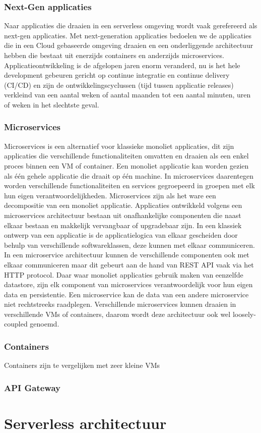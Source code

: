 \subsubsection{Next-Gen applicaties}
Naar applicaties die draaien in een serverless omgeving wordt vaak gerefereerd als next-gen applicaties. Met next-generation applicaties bedoelen we de applicaties die in een Cloud gebaseerde omgeving draaien en een onderliggende architectuur hebben die bestaat uit enerzijds containers en anderzijds microservices. Applicatieontwikkeling is de afgelopen jaren enorm veranderd, nu is het hele development gebeuren gericht op continue integratie en continue delivery (CI/CD) en zijn de ontwikkelingscyclussen (tijd tussen applicatie releases) verkleind van een aantal weken of aantal maanden tot een aantal minuten, uren of weken in het slechtste geval. 

\subsubsection{Microservices}
Microservices is een alternatief voor klassieke monoliet applicaties, dit zijn applicaties die verschillende functionaliteiten omvatten en draaien als een enkel proces binnen een VM of container. Een monoliet applicatie kan worden gezien als één gehele applicatie die draait op één machine.  In microservices daarentegen worden verschillende functionaliteiten en services gegroepeerd in groepen met elk hun eigen verantwoordelijkheden. Microservices zijn als het ware  een decompositie van een monoliet applicatie. Applicaties ontwikkeld volgens een microservices architectuur bestaan uit onafhankelijke componenten die naast elkaar bestaan en makkelijk vervangbaar of upgradebaar zijn. In een klassiek ontwerp van een applicatie is de applicatielogica van elkaar gescheiden door behulp van verschillende softwareklassen, deze kunnen met elkaar communiceren. In een microservice architectuur kunnen de verschillende componenten ook met elkaar communiceren maar dit gebeurt aan de hand van REST API vaak via het HTTP protocol. Daar waar monoliet applicaties gebruik maken van eenzelfde datastore, zijn elk component van microservices verantwoordelijk voor hun eigen data en persistentie. Een microservice kan de data van een andere microservice niet rechtstreeks raadplegen. Verschillende microservices kunnen draaien in verschillende VMs of containers, daarom wordt deze architectuur ook wel loosely-coupled genoemd.\autocite{Fowler2014}

\subsubsection{Containers}
Containers zijn te vergelijken met zeer kleine VMs 
\subsubsection{API Gateway}

\section{Serverless architectuur}

